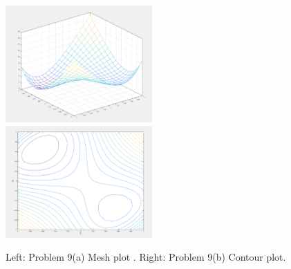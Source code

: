 \documentclass{article}
\begin{document}
\begin{figure} 
\includegraphics[width=0.5\textwidth]{mesh} 
\includegraphics[width=0.5\textwidth]{contour} 

\caption{Left: Problem 9(a) Mesh plot . Right: Problem 9(b) Contour plot. } 

\end{figure} 
\end{document}
